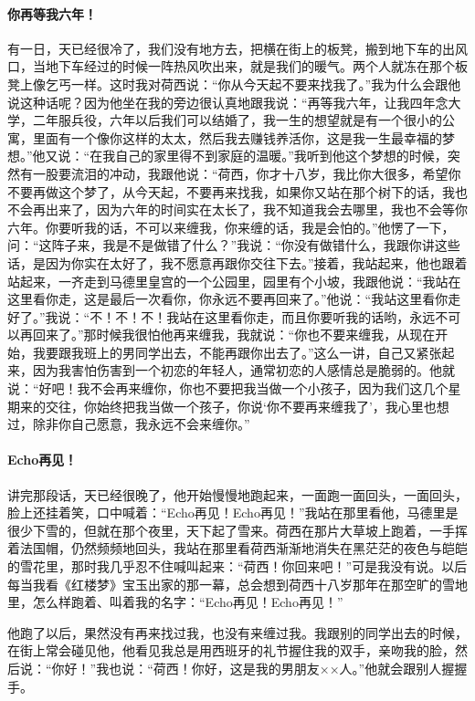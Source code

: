 \paragraph{你再等我六年！}
\par 有一日，天已经很冷了，我们没有地方去，把横在街上的板凳，搬到地下车的出风口，当地下车经过的时候一阵热风吹出来，就是我们的暖气。两个人就冻在那个板凳上像乞丐一样。这时我对荷西说：“你从今天起不要来找我了。”我为什么会跟他说这种话呢？因为他坐在我的旁边很认真地跟我说：“再等我六年，让我四年念大学，二年服兵役，六年以后我们可以结婚了，我一生的想望就是有一个很小的公寓，里面有一个像你这样的太太，然后我去赚钱养活你，这是我一生最幸福的梦想。”他又说：“在我自己的家里得不到家庭的温暖。”我听到他这个梦想的时候，突然有一股要流泪的冲动，我跟他说：“荷西，你才十八岁，我比你大很多，希望你不要再做这个梦了，从今天起，不要再来找我，如果你又站在那个树下的话，我也不会再出来了，因为六年的时间实在太长了，我不知道我会去哪里，我也不会等你六年。你要听我的话，不可以来缠我，你来缠的话，我是会怕的。”他愣了一下，问：“这阵子来，我是不是做错了什么？”我说：“你没有做错什么，我跟你讲这些话，是因为你实在太好了，我不愿意再跟你交往下去。”接着，我站起来，他也跟着站起来，一齐走到马德里皇宫的一个公园里，园里有个小坡，我跟他说：“我站在这里看你走，这是最后一次看你，你永远不要再回来了。”他说：“我站这里看你走好了。”我说：“不！不！不！我站在这里看你走，而且你要听我的话哟，永远不可以再回来了。”那时候我很怕他再来缠我，我就说：“你也不要来缠我，从现在开始，我要跟我班上的男同学出去，不能再跟你出去了。”这么一讲，自己又紧张起来，因为我害怕伤害到一个初恋的年轻人，通常初恋的人感情总是脆弱的。他就说：“好吧！我不会再来缠你，你也不要把我当做一个小孩子，因为我们这几个星期来的交往，你始终把我当做一个孩子，你说‘你不要再来缠我了’，我心里也想过，除非你自己愿意，我永远不会来缠你。”
\paragraph{Echo再见！}
\par 讲完那段话，天已经很晚了，他开始慢慢地跑起来，一面跑一面回头，一面回头，脸上还挂着笑，口中喊着：“Echo再见！Echo再见！”我站在那里看他，马德里是很少下雪的，但就在那个夜里，天下起了雪来。荷西在那片大草坡上跑着，一手挥着法国帽，仍然频频地回头，我站在那里看荷西渐渐地消失在黑茫茫的夜色与皑皑的雪花里，那时我几乎忍不住喊叫起来：“荷西！你回来吧！”可是我没有说。以后每当我看《红楼梦》宝玉出家的那一幕，总会想到荷西十八岁那年在那空旷的雪地里，怎么样跑着、叫着我的名字：“Echo再见！Echo再见！”
\par 他跑了以后，果然没有再来找过我，也没有来缠过我。我跟别的同学出去的时候，在街上常会碰见他，他看见我总是用西班牙的礼节握住我的双手，亲吻我的脸，然后说：“你好！”我也说：“荷西！你好，这是我的男朋友××人。”他就会跟别人握握手。
